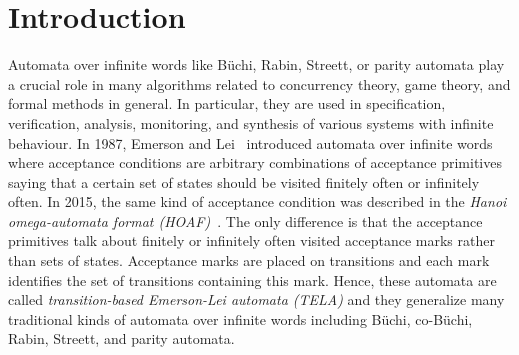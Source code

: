\documentclass[runningheads]{llncs}
\begin{document}


\section{Introduction}


Automata over infinite words like Büchi, Rabin, Streett, or parity
automata play a crucial role in many algorithms related to 
concurrency theory, game theory, and formal methods in general. In
particular, they are used in specification, verification, analysis,
monitoring, and synthesis of various systems with infinite
behaviour. In 1987, Emerson and Lei~\cite{emerson.87.scp} introduced
automata over infinite words where acceptance conditions are arbitrary
combinations of acceptance primitives saying that a certain set of
states should be visited finitely often or infinitely often. In 2015,
the same kind of acceptance condition was described in the \emph{Hanoi
  omega-automata format (HOAF)}~\cite{babiak.15.cav}. The only
difference is that the acceptance primitives talk about finitely or
infinitely often visited acceptance marks rather than sets of states.
Acceptance marks are placed on transitions and each mark identifies
the set of transitions containing this mark. Hence, these automata are
called \emph{transition-based Emerson-Lei automata (TELA)} and they
generalize many traditional kinds of automata over infinite words
including Büchi, co-Büchi, Rabin, Streett, and parity automata.
\end{document}
